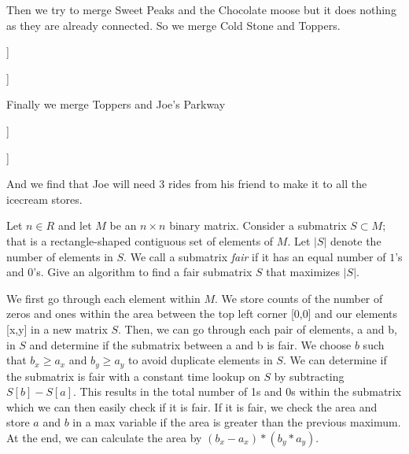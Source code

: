 \documentclass{article}
\begin{document}
Then we try to merge Sweet Peaks and the Chocolate moose but it does nothing as they are already connected. So we merge Cold Stone and Toppers.

\begin{forest}
[The Chocolate Moose
	[Genuine Ice Cream]
	[Sweet Peaks]]
\end{forest}
\begin{forest}
\end{forest}
\begin{forest}
[Cold Stone
	[Toppers]]
\end{forest}
\begin{forest}
\end{forest}

Finally we merge Toppers and Joe's Parkway

\begin{forest}
[The Chocolate Moose
	[Genuine Ice Cream]
	[Sweet Peaks]]
\end{forest}
\begin{forest}
\end{forest}
\begin{forest}
[Cold Stone
	[Toppers]
	[Joe's Parkway]]
\end{forest}

And we find that Joe will need 3 rides from his friend to make it to all the icecream stores.

\nextprob
Let $n \in R$ and let $M$ be an $n \times n$ binary matrix.  Consider a
submatrix $S \subset M$; that is a rectangle-shaped contiguous set of
elements of $M$.  Let $|S|$ denote the number of elements in $S$.  We call a
submatrix \emph{fair} if it has an equal number of $1$'s and $0$'s.  Give an
algorithm to find a fair submatrix $S$ that maximizes $|S|$.


We first go through each element within $M$. We store counts of the number of zeros and ones within the area between the top left corner [0,0] and our elements [x,y] in a new matrix $S$. Then, we can go through each pair of elements, a and b, in $S$ and determine if the submatrix between a and b is fair. We choose $b$ such that $b_x \geq a_x$ and $b_y \geq a_y$ to avoid duplicate elements in $S$. We can determine if the submatrix is fair with a constant time lookup on $S$ by subtracting $S[b] - S[a]$. This results in the total number of 1s and 0s within the submatrix which we can then easily check if it is fair. If it is fair, we check the area and store $a$ and $b$ in a max variable if the area is greater than the previous maximum. At the end, we can calculate the area by $(b_x - a_x) * (b_y * a_y)$.
\end{document}
